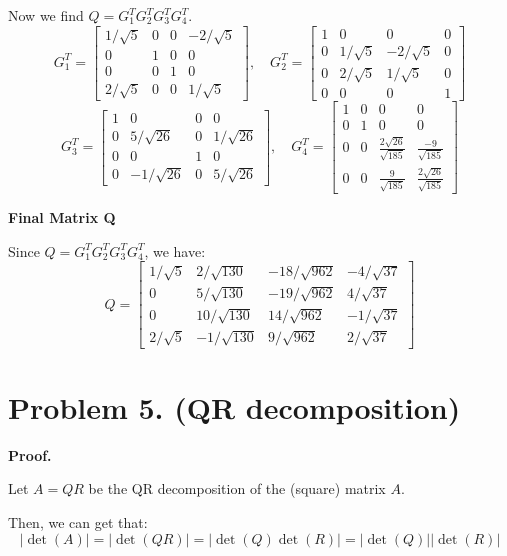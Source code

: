 \documentclass{article}
\newcommand{\0}{{\mathbf{0}}} %
\begin{document}
Now we find $Q = G_1^T G_2^T G_3^T G_4^T$.
$$ G_1^T =
\begin{bmatrix} 1/\sqrt{5} & 0 & 0 & -2/\sqrt{5} \\ 0 & 1 & 0 & 0 \\ 0 & 0 & 1 & 0 \\ 2/\sqrt{5} & 0 & 0 & 1/\sqrt{5}
\end{bmatrix}, \quad G_2^T =
\begin{bmatrix} 1 & 0 & 0 & 0 \\ 0 & 1/\sqrt{5} & -2/\sqrt{5} & 0 \\ 0 & 2/\sqrt{5} & 1/\sqrt{5} & 0 \\ 0 & 0 & 0 & 1
\end{bmatrix} $$
$$ G_3^T =
\begin{bmatrix} 1 & 0 & 0 & 0 \\ 0 & 5/\sqrt{26} & 0 & 1/\sqrt{26} \\ 0 & 0 & 1 & 0 \\ 0 & -1/\sqrt{26} & 0 & 5/\sqrt{26}
\end{bmatrix}, \quad G_4^T =
\begin{bmatrix} 1 & 0 & 0 & 0 \\ 0 & 1 & 0 & 0 \\ 0 & 0 & \frac{2\sqrt{26}}{\sqrt{185}} & \frac{-9}{\sqrt{185}} \\ 0 & 0 & \frac{9}{\sqrt{185}} & \frac{2\sqrt{26}}{\sqrt{185}}
\end{bmatrix} $$

\textbf{Final Matrix Q}

Since $Q = G_1^T G_2^T G_3^T G_4^T$, we have:
$$ Q =
\begin{bmatrix}
1/\sqrt{5} & 2/\sqrt{130} & -18/\sqrt{962} & -4/\sqrt{37} \\
0 & 5/\sqrt{130} & -19/\sqrt{962} & 4/\sqrt{37} \\
0 & 10/\sqrt{130} & 14/\sqrt{962} & -1/\sqrt{37} \\
2/\sqrt{5} & -1/\sqrt{130} & 9/\sqrt{962} & 2/\sqrt{37}
\end{bmatrix}
$$

\section*{Problem 5. (QR decomposition)}
\textbf{Proof.}

Let $A = QR$ be the QR decomposition of the (square) matrix $A$.

Then, we can get that:
$$
|\det(A)| = |\det(QR)| = |\det(Q) \det(R)| = |\det(Q)| |\det(R)|
$$
\end{document}
